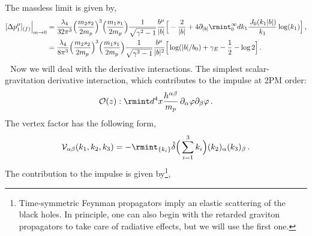 The massless limit is given by,
\begin{align}
    \begin{split}
      [\Delta p_1^{\mu}]_{(f)}\Big|_{m\rightarrow 0}   &=\frac{\lambda_4 }{32\pi^3}\Big(\frac{m_2 s_2}{2m_p}\Big)^3\Big( \frac{m_1 s_1}{2 m_p}\Big)\frac{1}{\sqrt{\gamma^2-1}}\frac{b^\mu}{|b|}\Big[-\frac{2}{|b|}+4\partial_{|b|}\rmint_0^\infty dk_1\frac{ \,J_{0}(k_1 |b|)}{k_1}\log(k_1)\Big]\,,\\ &
     =\frac{\lambda_4}{8\pi^3} \Big(\frac{m_2 s_2}{2m_p}\Big)^3\Big( \frac{m_1 s_1}{2 m_p}\Big)\frac{1}{\sqrt{\gamma^2-1}}\frac{b^\mu}{|b|^2}\Big[\log (|b|/b_0)+\gamma_E-\frac{1}{2}-\log 2\Big]\,.
    \end{split}
\end{align}
\textbullet $\,\,$ Now we will deal with the derivative interactions. The simplest scalar-gravitation derivative interaction, which contributes to the impulse at 2PM order:
\begin{align}
    \begin{split}
        \mathcal{O}(z):\rmint d^4x \frac{h^{\alpha\beta}}{m_p}\,\partial_{\alpha}\varphi\partial_{\beta}\varphi\,.
    \end{split}
\end{align}
\vspace{-0.53 cm}
The vertex factor has the following form,
\begin{align}
    \begin{split}
        \mathcal{V}_{\alpha\beta}(k_1,k_2,k_3)=  -\rmint_{\{k_{i}\}}  \hat\delta\Big(\sum_{i=1}^{3}k_{i}\Big)   (k_2)_{\alpha} (k_3)_{\beta}\,.
    \end{split}
\end{align}
The contribution to the impulse is given by\footnote{Time-symmetric Feynman propagators imply an elastic scattering of the black holes. In principle, one can also begin with the retarded graviton propagators to take care of radiative effects, but we will use the first one.},
